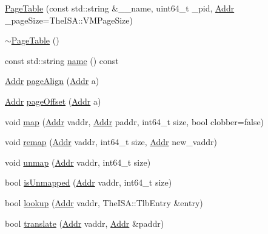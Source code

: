 \begin{DoxyCompactItemize}
\item 
\hyperlink{classPageTable_a0ba607685599040207fa0f5834252a97}{PageTable} (const std::string \&\_\-\_\-name, uint64\_\-t \_\-pid, \hyperlink{base_2types_8hh_af1bb03d6a4ee096394a6749f0a169232}{Addr} \_\-pageSize=TheISA::VMPageSize)
\item 
\hyperlink{classPageTable_ac8d0a10aebf4985568764273ad64d267}{$\sim$PageTable} ()
\item 
const std::string \hyperlink{classPageTable_a6490f765a824ced1cc94979609fe7e07}{name} () const 
\item 
\hyperlink{base_2types_8hh_af1bb03d6a4ee096394a6749f0a169232}{Addr} \hyperlink{classPageTable_a38247c4bd6655c6c275b578bd72e63e4}{pageAlign} (\hyperlink{base_2types_8hh_af1bb03d6a4ee096394a6749f0a169232}{Addr} a)
\item 
\hyperlink{base_2types_8hh_af1bb03d6a4ee096394a6749f0a169232}{Addr} \hyperlink{classPageTable_aea9a0188c4082f2d04b870ee4d03103c}{pageOffset} (\hyperlink{base_2types_8hh_af1bb03d6a4ee096394a6749f0a169232}{Addr} a)
\item 
void \hyperlink{classPageTable_aff59f07ef2928facc67674a304b1e7e9}{map} (\hyperlink{base_2types_8hh_af1bb03d6a4ee096394a6749f0a169232}{Addr} vaddr, \hyperlink{base_2types_8hh_af1bb03d6a4ee096394a6749f0a169232}{Addr} paddr, int64\_\-t size, bool clobber=false)
\item 
void \hyperlink{classPageTable_a42230248f7e6b36d1d039334dfc8c73b}{remap} (\hyperlink{base_2types_8hh_af1bb03d6a4ee096394a6749f0a169232}{Addr} vaddr, int64\_\-t size, \hyperlink{base_2types_8hh_af1bb03d6a4ee096394a6749f0a169232}{Addr} new\_\-vaddr)
\item 
void \hyperlink{classPageTable_a8655228481877dd15f31d7657b7636f0}{unmap} (\hyperlink{base_2types_8hh_af1bb03d6a4ee096394a6749f0a169232}{Addr} vaddr, int64\_\-t size)
\item 
bool \hyperlink{classPageTable_ab21bd7c6a258cbbe96db22e978a0ee70}{isUnmapped} (\hyperlink{base_2types_8hh_af1bb03d6a4ee096394a6749f0a169232}{Addr} vaddr, int64\_\-t size)
\item 
bool \hyperlink{classPageTable_a5a9bd017a274b26bec6d93084a06a786}{lookup} (\hyperlink{base_2types_8hh_af1bb03d6a4ee096394a6749f0a169232}{Addr} vaddr, TheISA::TlbEntry \&entry)
\item 
bool \hyperlink{classPageTable_a1fa58423b982a3454aadc9b5e932e9ed}{translate} (\hyperlink{base_2types_8hh_af1bb03d6a4ee096394a6749f0a169232}{Addr} vaddr, \hyperlink{base_2types_8hh_af1bb03d6a4ee096394a6749f0a169232}{Addr} \&paddr)

\end{DoxyCompactItemize}
